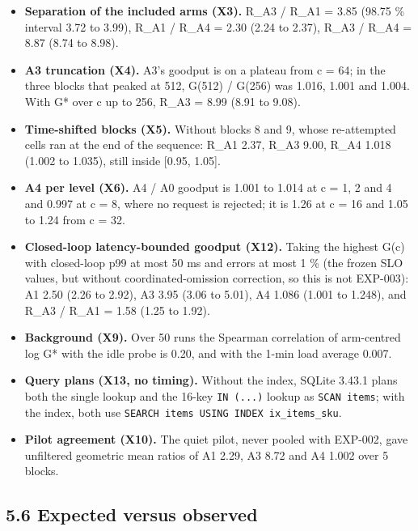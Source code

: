 \documentclass[
]{article}
\providecommand{\tightlist}{%
  \setlength{\itemsep}{0pt}\setlength{\parskip}{0pt}}
\begin{document}
\begin{itemize}
\tightlist
\item
  \textbf{Separation of the included arms (X3).} R\_A3 / R\_A1 = 3.85
  (98.75 \% interval 3.72 to 3.99), R\_A1 / R\_A4 = 2.30 (2.24 to 2.37),
  R\_A3 / R\_A4 = 8.87 (8.74 to 8.98).
\item
  \textbf{A3 truncation (X4).} A3's goodput is on a plateau from c = 64;
  in the three blocks that peaked at 512, G(512) / G(256) was 1.016,
  1.001 and 1.004. With G* over c up to 256, R\_A3 = 8.99 (8.91 to
  9.08).
\item
  \textbf{Time-shifted blocks (X5).} Without blocks 8 and 9, whose
  re-attempted cells ran at the end of the sequence: R\_A1 2.37, R\_A3
  9.00, R\_A4 1.018 (1.002 to 1.035), still inside {[}0.95, 1.05{]}.
\item
  \textbf{A4 per level (X6).} A4 / A0 goodput is 1.001 to 1.014 at c =
  1, 2 and 4 and 0.997 at c = 8, where no request is rejected; it is
  1.26 at c = 16 and 1.05 to 1.24 from c = 32.
\item
  \textbf{Closed-loop latency-bounded goodput (X12).} Taking the highest
  G(c) with closed-loop p99 at most 50 ms and errors at most 1 \% (the
  frozen SLO values, but without coordinated-omission correction, so
  this is not EXP-003): A1 2.50 (2.26 to 2.92), A3 3.95 (3.06 to 5.01),
  A4 1.086 (1.001 to 1.248), and R\_A3 / R\_A1 = 1.58 (1.25 to 1.92).
\item
  \textbf{Background (X9).} Over 50 runs the Spearman correlation of
  arm-centred log G* with the idle probe is 0.20, and with the 1-min
  load average 0.007.
\item
  \textbf{Query plans (X13, no timing).} Without the index, SQLite
  3.43.1 plans both the single lookup and the 16-key \texttt{IN\ (...)}
  lookup as \texttt{SCAN\ items}; with the index, both use
  \texttt{SEARCH\ items\ USING\ INDEX\ ix\_items\_sku}.
\item
  \textbf{Pilot agreement (X10).} The quiet pilot, never pooled with
  EXP-002, gave unfiltered geometric mean ratios of A1 2.29, A3 8.72 and
  A4 1.002 over 5 blocks.
\end{itemize}

\subsection{5.6 Expected versus
observed}\label{expected-versus-observed}
\end{document}
